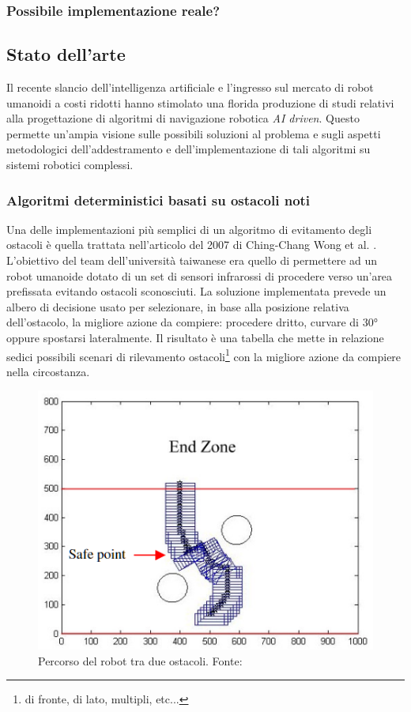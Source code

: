 
\subsubsection{Possibile implementazione reale?}


\subsection{Stato dell'arte}
Il recente slancio dell'intelligenza artificiale e l'ingresso sul mercato di robot umanoidi a costi ridotti hanno stimolato una florida produzione di studi relativi alla progettazione di algoritmi di navigazione robotica \textit{AI driven}. Questo permette un'ampia visione sulle possibili soluzioni al problema e sugli aspetti metodologici dell'addestramento e dell'implementazione di tali algoritmi su sistemi robotici complessi. 


\subsubsection{Algoritmi deterministici basati su ostacoli noti}
Una delle implementazioni più semplici di un algoritmo di evitamento degli ostacoli è quella trattata nell'articolo del 2007 di Ching-Chang Wong et al. \cite{wong2007design}. L'obiettivo del team dell'università taiwanese era quello di permettere ad un robot umanoide dotato di un set di sensori infrarossi di procedere verso un'area prefissata evitando ostacoli sconosciuti. La soluzione implementata prevede un albero di decisione usato per selezionare, in base alla posizione relativa dell'ostacolo, la migliore azione da compiere: procedere dritto, curvare di 30° oppure spostarsi lateralmente. Il risultato è una tabella che mette in relazione sedici possibili scenari di rilevamento ostacoli\footnote{di fronte, di lato, multipli, etc...} con la migliore azione da compiere nella circostanza.

\begin{figure}[h]
    \centering
    \includegraphics[width=0.35\linewidth]{immagini/simple_OA_IR.png}
    \caption{Percorso del robot tra due ostacoli. Fonte: \cite{wong2007design}}
    \label{fig:simple_ao}
\end{figure}

